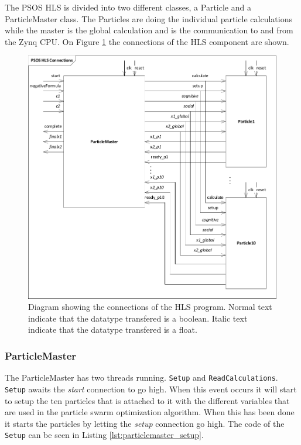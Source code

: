 The PSOS HLS is divided into two different classes, a Particle and a ParticleMaster class. The Particles are doing the individual particle calculations while the master is the global calculation and is the communication to and from the Zynq CPU. On Figure \ref{fig:psoshlsconnections} the connections of the HLS component are shown.\\

\begin{figure}
	\centering
	\includegraphics[width=0.7\linewidth]{diagram/psos_hls_connections}
	\caption{Diagram showing the connections of the HLS program. Normal text indicate that the datatype transfered is a boolean. Italic text indicate that the datatype transfered is a float.}
	\label{fig:psoshlsconnections}
\end{figure}

\subsubsection{ParticleMaster}

The ParticleMaster has two threads running. \texttt{Setup} and \texttt{ReadCalculations}. \texttt{Setup} awaits the \textit{start} connection to go high. When this event occurs it will start to setup the ten particles that is attached to it with the different variables that are used in the particle swarm optimization algorithm. When this has been done it starts the particles by letting the \textit{setup} connection go high. The code of the \texttt{Setup} can be seen in Listing \ref{lst:particlemaster_setup}.\\

